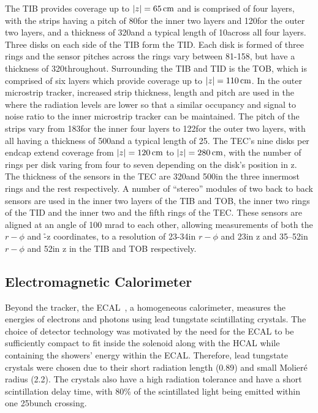The TIB provides coverage up to $|z| = 65\,\text{cm}$ and is comprised of four layers, with the strips having a pitch of 80\mum for the inner two layers and 120\mum for the outer two layers, and a thickness of 320\mum and a typical length of 10\cm across all four layers.
Three disks on each side of the TIB form the TID. 
Each disk is formed of three rings and the sensor pitches across the rings vary between 81-158\mum, but have a thickness of 320\mum throughout.
Surrounding the TIB and TID is the TOB,	which is comprised of six layers which provide coverage up to $|z| = 110\,\text{cm}$.
In the outer microstrip tracker, increased strip thickness, length and pitch are used in the where the radiation levels are lower so that a similar occupancy and signal to noise ratio to the inner microstrip tracker can be maintained.
The pitch of the strips vary from 183\mum for the inner four layers to 122\mum for the outer two layers, with all having a thickness of 500\mum and a typical length of 25\cm. 
The TEC's nine disks per endcap extend coverage from $|z| = 120\,\text{cm}$ to $|z| = 280\,\text{cm}$, with the number of rings per disk varing from four to seven depending on the disk's position in z.
The thickness of the sensors in the TEC are 320\mum and 500\mum in the three innermost rings and the rest respectively.
A number of ``stereo'' modules of two back to back sensors are used in the inner two layers of the TIB and TOB, the inner two rings of the TID and the inner two and the fifth rings of the TEC.
These sensors are aligned at an angle of 100 mrad to each other, allowing measurements of both the $r-\phi$ and \r-z coordinates, to a resolution of 23-34\mum in $r-\phi$ and 23\mum in z and 35–52\mum in $r-\phi$ and 52\mum in z in the TIB and TOB respectively.

\subsection{Electromagnetic Calorimeter}\label{subsec:ECAL}
Beyond the tracker, the ECAL~\cite{CMS:1997ysd,CMS:2002xia}, a homogeneous calorimeter, measures the energies of electrons and photons using lead tungstate scintillating crystals.
The choice of detector technology was motivated by the need for the ECAL to be sufficiently compact to fit inside the solenoid along with the HCAL while containing the showers' energy within the ECAL.
Therefore, lead tungstate crystals were chosen due to their short radiation length (0.89\cm) and small Molier\'{e} radius (2.2\cm).
The crystals also have a high radiation tolerance and have a short scintillation delay time, with 80\% of the scintillated light being emitted within one 25\ns bunch crossing.

